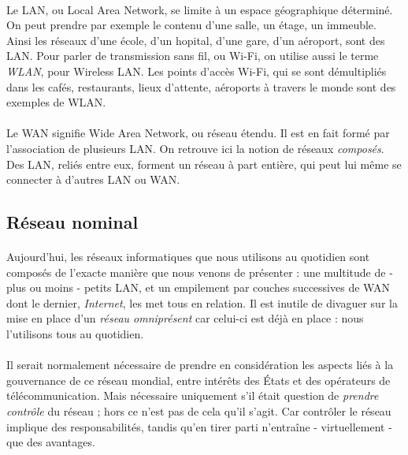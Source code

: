 \paragraph{} Le LAN, ou Local Area Network, se limite à un espace géographique déterminé. On peut prendre
par exemple le contenu d'une salle, un étage, un immeuble. Ainsi les réseaux d'une école, d'un
hopital, d'une gare, d'un aéroport, sont des LAN. Pour parler de transmission sans fil, ou
Wi-Fi, on utilise aussi le terme \emph{WLAN}, pour Wireless LAN. Les points d'accès Wi-Fi, qui se
sont démultipliés dans les cafés, restaurants, lieux d'attente, aéroports à travers le monde
sont des exemples de WLAN.

\paragraph{} Le WAN signifie Wide Area Network, ou réseau étendu. Il est en fait formé par
l'association de plusieurs LAN. On retrouve ici la notion de réseaux \emph{composés}. Des LAN,
reliés entre eux, forment un réseau à part entière, qui peut lui même se connecter à d'autres
LAN ou WAN.


\subsection*{Réseau nominal} 

\paragraph{} Aujourd'hui, les réseaux informatiques que nous utilisons au quotidien sont composés
de l'exacte manière que nous venons de présenter : une multitude de - plus ou moins - petits LAN, et un empilement
par couches successives de WAN dont le dernier, \emph{Internet}, les met tous en relation. Il est inutile de divaguer
sur la mise en place d'un \emph{réseau omniprésent} car celui-ci est déjà en place : nous l'utilisons tous au quotidien.

\paragraph{} Il serait normalement nécessaire de prendre en considération les aspects liés à la gouvernance de ce réseau 
mondial, entre intérêts des États et des opérateurs de télécommunication. Mais nécessaire uniquement s'il était question
de \emph{prendre contrôle} du réseau ; hors ce n'est pas de cela qu'il s'agit. Car contrôler le réseau implique des 
responsabilités, tandis qu'en tirer parti n'entraîne - virtuellement - que des avantages.

